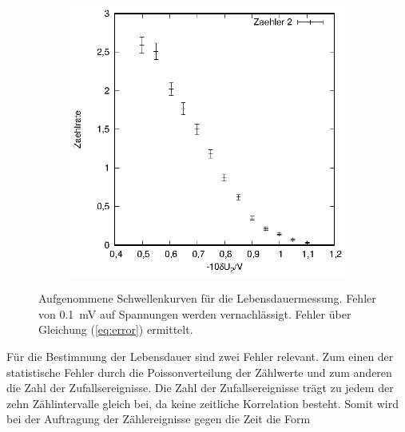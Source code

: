 \begin{figure}[h]
\begin{subfigure}[h]{0.5\textwidth}
  \end{subfigure}%
  \begin{subfigure}[h]{0.5\textwidth}
    \centering
    \includegraphics[width=\textwidth]{data/schwelle_2_zaehler.eps}
  \end{subfigure}
  \caption{Aufgenommene Schwellenkurven für die Lebensdauermessung. Fehler von \SI{0.1}{\milli\volt} auf Spannungen werden vernachlässigt. Fehler über Gleichung (\ref{eq:error}) ermittelt.}
  \label{fig:schwelle_lebensdauer}
\end{figure} 

\FloatBarrier

Für die Bestimmung der Lebensdauer sind zwei Fehler relevant. Zum einen der statistische Fehler durch die Poissonverteilung der Zählwerte und zum anderen die Zahl der Zufallsereignisse. Die Zahl der Zufallsereignisse trägt zu jedem der zehn Zählintervalle gleich bei, da keine zeitliche Korrelation besteht. Somit wird bei der Auftragung der Zählereignisse gegen die Zeit die Form

